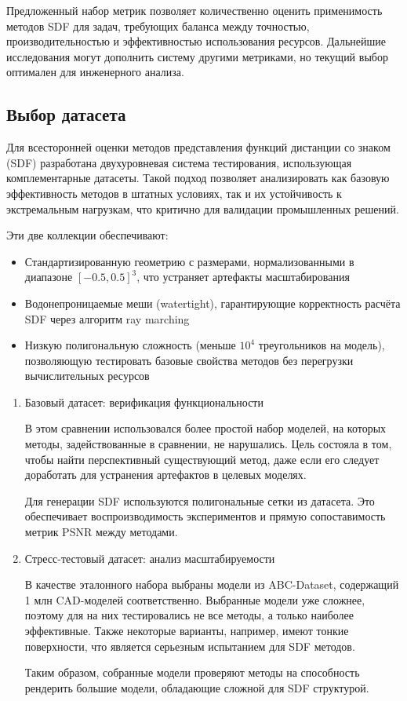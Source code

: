 \documentclass[a4paper,hidelinks,12pt]{article}
\begin{document}
\par
Предложенный набор метрик позволяет количественно оценить применимость методов SDF для задач, требующих баланса между точностью, производительностью и эффективностью использования ресурсов. Дальнейшие исследования могут дополнить систему другими метриками, но текущий выбор оптимален для инженерного анализа.

\newpage

\subsection{Выбор датасета}

Для всесторонней оценки методов представления функций дистанции со знаком (SDF) разработана двухуровневая система 
тестирования, использующая комплементарные датасеты. Такой подход позволяет анализировать как базовую эффективность 
методов в штатных условиях, так и их устойчивость к экстремальным нагрузкам, что критично для валидации промышленных решений.

Эти  две коллекции обеспечивают:

\begin{itemize}
	\item Стандартизированную геометрию с размерами, нормализованными в диапазоне $[-0.5, 0.5]^3$, что устраняет артефакты масштабирования
	\item Водонепроницаемые меши (watertight), гарантирующие корректность расчёта SDF через алгоритм ray marching
	\item Низкую полигональную сложность (меньше $10^4$ треугольников на модель), позволяющую тестировать базовые свойства методов без перегрузки вычислительных ресурсов
\end{itemize}

\begin{enumerate}
	\item Базовый датасет: верификация функциональности
	\par
	В этом сравнении использовался более простой набор моделей, на которых методы, задействованные в сравнении, 
	не нарушались. Цель состояла в том, чтобы найти перспективный существующий метод, даже если его следует доработать для 
	устранения артефактов в целевых моделях.

	Для генерации SDF используются полигональные сетки из датасета. Это обеспечивает воспроизводимость экспериментов и 
	прямую сопоставимость метрик PSNR между методами.

	\item Стресс-тестовый датасет: анализ масштабируемости
	\par
	В качестве эталонного набора выбраны модели из ABC-Dataset, содержащий 1 млн CAD-моделей соответственно. Выбранные модели уже сложнее, поэтому 
	для на них тестировались не все методы, а только наиболее эффективные. Также некоторые варианты, например, имеют тонкие поверхности, что является серьезным 
	испытанием для SDF методов. 

	Таким образом, собранные модели проверяют методы на способность рендерить большие модели, обладающие сложной для SDF структурой.

\end{enumerate}
\end{document}

